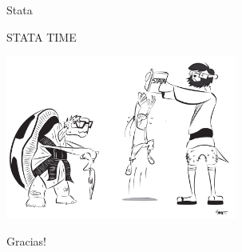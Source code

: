 \documentclass[11pt, aspectratio=169, compress]{beamer}
\makeatletter
\def\beamer@writeslidentry@miniframesoff{%
	\expandafter\beamer@ifempty\expandafter{\beamer@framestartpage}{}%
	{%
		\clearpage\beamer@notesactions%
	}
}
\newcommand*{\miniframesoff}{\let\beamer@writeslidentry=\beamer@writeslidentry@miniframesoff}
\makeatother
\begin{document}
\begin{frame}{Stata}
	\begin{center}
	\LARGE STATA TIME
		\begin{center}
		\includegraphics[width=0.57\textwidth]{fig/fig1.pdf}
		\end{center}
	\end{center}
\end{frame}
\miniframesoff 	
\begin{frame}
Gracias! 
\end{frame}
\end{document}
